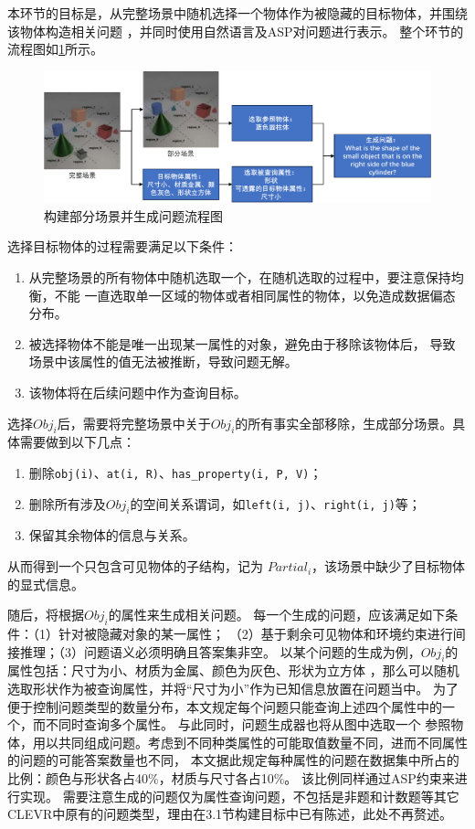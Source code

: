 本环节的目标是，从完整场景中随机选择一个物体作为被隐藏的目标物体，并围绕该物体构造相关问题
，并同时使用自然语言及ASP对问题进行表示。
整个环节的流程图如\ref{generate-partial-scenes-and-questions}所示。
\begin{figure}[h]
\centering
\includegraphics[scale=0.6]{figures/部分场景及问题生成-crop.pdf}
\caption{构建部分场景并生成问题流程图}
\label{generate-partial-scenes-and-questions}
\end{figure}

选择目标物体的过程需要满足以下条件：
\begin{enumerate}[nosep]
\item 从完整场景的所有物体中随机选取一个，在随机选取的过程中，要注意保持均衡，不能
一直选取单一区域的物体或者相同属性的物体，以免造成数据偏态分布。
\item 被选择物体不能是唯一出现某一属性的对象，避免由于移除该物体后，
导致场景中该属性的值无法被推断，导致问题无解。
\item 该物体将在后续问题中作为查询目标。
\end{enumerate}

选择$Obj_i$后，需要将完整场景中关于$Obj_i$的所有事实全部移除，生成部分场景。具体需要做到以下几点：
\begin{enumerate}[nosep]
\item 删除\texttt{obj(i)}、\texttt{at(i, R)}、\texttt{has\_property(i, P, V)}；
\item 删除所有涉及$Obj_i$的空间关系谓词，如\texttt{left(i, j)}、\texttt{right(i, j)}等；
\item 保留其余物体的信息与关系。
\end{enumerate}
从而得到一个只包含可见物体的子结构，记为 $Partial_i$，该场景中缺少了目标物体的显式信息。

随后，将根据$Obj_i$的属性来生成相关问题。
每一个生成的问题，应该满足如下条件：（1）针对被隐藏对象的某一属性；
（2）基于剩余可见物体和环境约束进行间接推理；（3）问题语义必须明确且答案集非空。
以某个问题的生成为例，$Obj_i$的属性包括：尺寸为小、材质为金属、颜色为灰色、形状为立方体
，那么可以随机选取形状作为被查询属性，并将“尺寸为小”作为已知信息放置在问题当中。
为了便于控制问题类型的数量分布，本文规定每个问题只能查询上述四个属性中的一个，而不同时查询多个属性。
与此同时，问题生成器也将从图中选取一个
参照物体，用以共同组成问题。考虑到不同种类属性的可能取值数量不同，进而不同属性的问题的可能答案数量也不同，
本文据此规定每种属性的问题在数据集中所占的比例：颜色与形状各占40\%，材质与尺寸各占10\%。
该比例同样通过ASP约束来进行实现。
需要注意生成的问题仅为属性查询问题，不包括是非题和计数题等其它CLEVR中原有的问题类型，理由在3.1节构建目标中已有陈述，此处不再赘述。

